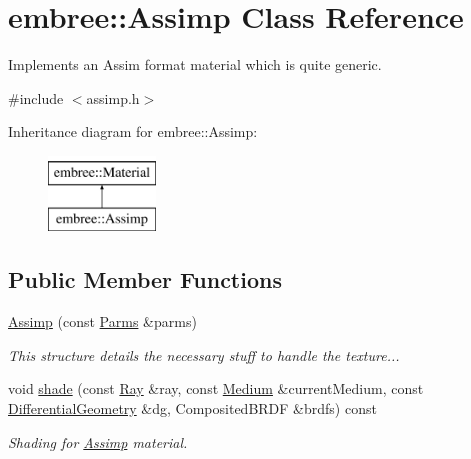 \hypertarget{classembree_1_1_assimp}{
\section{embree::Assimp Class Reference}
\label{classembree_1_1_assimp}
}


Implements an Assim format material which is quite generic.  




{\ttfamily \#include $<$assimp.h$>$}

Inheritance diagram for embree::Assimp:\begin{figure}[H]
\begin{center}
\leavevmode
\includegraphics[height=2.000000cm]{classembree_1_1_assimp}
\end{center}
\end{figure}
\subsection*{Public Member Functions}
\begin{DoxyCompactItemize}
\item 
\hyperlink{classembree_1_1_assimp_ac98e9bd9e464cccd1f68c456881cb0b3}{Assimp} (const \hyperlink{classembree_1_1_parms}{Parms} \&parms)
\begin{DoxyCompactList}\small\item\em This structure details the necessary stuff to handle the texture... \item\end{DoxyCompactList}\item 
void \hyperlink{classembree_1_1_assimp_a41253494303759e35a284c5bdcb890a5}{shade} (const \hyperlink{structembree_1_1_ray}{Ray} \&ray, const \hyperlink{classembree_1_1_medium}{Medium} \&currentMedium, const \hyperlink{structembree_1_1_differential_geometry}{DifferentialGeometry} \&dg, CompositedBRDF \&brdfs) const 
\begin{DoxyCompactList}\small\item\em Shading for \hyperlink{classembree_1_1_assimp}{Assimp} material. \item\end{DoxyCompactList}\end{DoxyCompactItemize}



